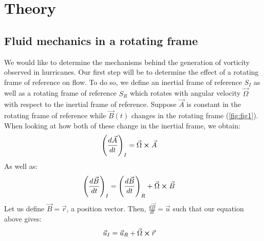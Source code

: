 \chapter{Theory}
\section{Fluid mechanics in a rotating frame}
\begin{minipage}{0.49\textwidth}
    We would like to determine the mechanisms behind the generation of vorticity observed in hurricanes. Our first step will be to determine the effect of a rotating frame of reference on flow. To do so, we define an inertial frame of reference $S_I$ as well as a rotating frame of reference $S_R$ which rotates with angular velocity $\vec{\Omega}$ with respect to the inertial frame of reference. Suppose $\vec{A}$ is constant in the rotating frame of reference while $\Vec{B}(t)$ changes in the rotating frame (\ref{fig:fig1}). When looking at how both of these change in the inertial frame, we obtain:
    \begin{align*}
        \left(\frac{d\vec{A}}{dt}\right)_{I} &= \vec{\Omega}\cross\vec{A}
    \end{align*}
    As well as:
    \begin{align}
        \left(\frac{d\vec{B}}{dt}\right)_{I} &= \left(\frac{d\vec{B}}{dt}\right)_{R}+\vec{\Omega}\cross\vec{B}
        \label{rule1}
    \end{align}
    Let us define $\vec{B}=\vec{r}$, a position vector. Then, $\frac{d\vec{B}}{dt}=\vec{u}$ such that our equation above gives:
    \begin{align}
        \vec{u}_I &= \vec{u}_R+\vec{\Omega}\cross\vec{r}
        \label{rule2}
    \end{align}
\end{minipage}\hspace{0.05\textwidth}
